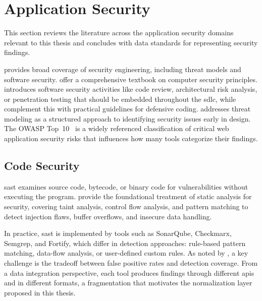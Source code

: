 
\section{Application Security}
\label{sec:appsec-literature}

This section reviews the literature across the application security domains relevant to this thesis and concludes with data standards for representing security findings.

\textcite{Anderson2020} provides broad coverage of security engineering, including threat models and software security. \textcite{Stallings2024} offer a comprehensive textbook on computer security principles. \textcite{McGraw2006} introduces software security activities like code review, architectural risk analysis, or penetration testing that should be embedded throughout the \gls{sdlc}, while \textcite{Howard2006} complement this with practical guidelines for defensive coding. \textcite{Shostack2014} addresses threat modeling as a structured approach to identifying security issues early in design. The OWASP Top~10~\parencite{OWASP2021} is a widely referenced classification of critical web application security risks that influences how many tools categorize their findings.


\subsection{Code Security}
\label{sec:code-security}

\Gls{sast} examines source code, bytecode, or binary code for vulnerabilities without executing the program. \textcite{Chess2007} provide the foundational treatment of static analysis for security, covering taint analysis, control flow analysis, and pattern matching to detect injection flaws, buffer overflows, and insecure data handling.

In practice, \gls{sast} is implemented by tools such as SonarQube, Checkmarx, Semgrep, and Fortify, which differ in detection approaches: rule-based pattern matching, data-flow analysis, or user-defined custom rules. As noted by \textcite{Chess2007}, a key challenge is the tradeoff between false positive rates and detection coverage. From a data integration perspective, each tool produces findings through different \glspl{api} and in different formats, a fragmentation that motivates the normalization layer proposed in this thesis.

